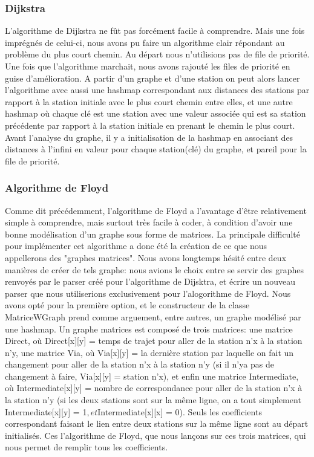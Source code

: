 \documentclass[french, 12pt]{article}
\begin{document}
\subsubsection{Dijkstra}
L'algorithme de Dijkstra ne fût pas forcément facile à comprendre. Mais une fois imprégnés de celui-ci, nous avons pu faire un algorithme clair répondant au problème du plus court chemin. Au départ nous n'utilisions pas de file de priorité.
Une fois que l'algorithme marchait, nous avons rajouté les files de priorité en guise d'amélioration.
A partir d'un graphe et d'une station on peut alors lancer l'algorithme avec aussi une hashmap correspondant aux distances des stations par rapport à la station initiale avec le plus court chemin entre elles, et une autre hashmap où chaque clé est une station avec une valeur associée qui est sa station précédente par rapport à la station initiale en prenant le chemin le plus court.
Avant l'analyse du graphe, il y a initialisation de la hashmap en associant des distances à l'infini en valeur pour chaque station(clé) du graphe, et pareil pour la file de priorité.

\subsubsection{Algorithme de Floyd}
Comme dit précédemment, l'algorithme de Floyd a l'avantage d'être relativement simple à comprendre, mais surtout très facile à coder, à condition d'avoir une bonne modélisation d'un graphe sous forme de matrices.
La principale difficulté pour implémenter cet algorithme a donc été la création de ce que nous appellerons des "graphes matrices". Nous avons longtemps hésité entre deux manières de créer de tels graphe: nous avions le choix entre se servir des graphes 
renvoyés par le parser créé pour l'algorithme de Dijsktra, et écrire un nouveau parser que nous utiliserions exclusivement pour l'alogorithme de Floyd. Nous avons opté pour la première option, et le constructeur de la classe MatriceWGraph prend comme arguement, entre autres,
un graphe modélisé par une hashmap. Un graphe matrices est composé de trois matrices: une matrice Direct, où Direct[x][y] = temps de trajet pour aller de la station n'x à la station n'y, une matrice Via, où
Via[x][y] = la dernière station par laquelle on fait un changement pour aller de la station n'x à la station n'y (si il n'ya pas de changement à faire, Via[x][y] = station n'x), et enfin une matrice Intermediate, où
Intermediate[x][y] = nombre de correspondance pour aller de la station n'x à la station n'y (si les deux stations sont sur la même ligne, on a tout simplement Intermediate[x][y] = 1$, et $Intermediate[x][x] = 0).
Seuls les coefficients correspondant faisant le lien entre deux stations sur la même ligne sont au départ initialisés. Ces l'algorithme de Floyd, que nous lançons sur ces trois matrices, qui nous permet de remplir tous les coefficients.  
\end{document}
